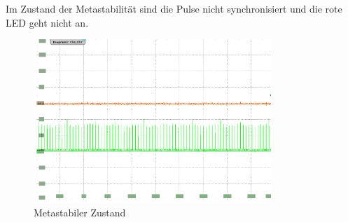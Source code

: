 \newpage
Im Zustand der Metastabilität sind die Pulse nicht synchronisiert und die rote LED geht nicht an.

\begin{figure}[H]
	\includegraphics[width=0.8\textwidth]{images/metastability/asynchron_en_.png}
	\caption{Metastabiler Zustand}
	\label{fig.metastabil.Metastabil}
\end{figure}
